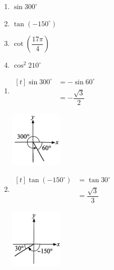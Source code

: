 \documentclass{report}
\begin{document}
\newpage
\begin{question}
    \begin{multicols}{4}
        \begin{enumerate}[label=(\alph*)]
            \item $\sin 300^\circ$
            \item $\tan\left(-150^\circ\right)$
            \item \vspace*{-1.1em}$\cot\left(\dfrac{17\pi}{4}\right)$
            \item $\cos^2 210^\circ$
        \end{enumerate}
    \end{multicols}

    \sol{}
        \begin{enumerate}[label=(\alph*),leftmargin=*]
            \item \begin{multicols}{2}
                $\begin{aligned}[t]
                    \sin 300^\circ &= -\sin 60^\circ \\
                    &= -\dfrac{\sqrt{3}}{2}
                \end{aligned}$
                \vfill\null
                \begin{center}
                    \includegraphics[width=0.2\textwidth]{assets/9-13.jpg}
                \end{center}
            \end{multicols}
            \vspace{-3em}
            \item \begin{multicols}{2}
                $\begin{aligned}[t]
                    \tan\left(-150^\circ\right) &= \tan 30^\circ \\
                    &= \dfrac{\sqrt{3}}{3}
                \end{aligned}$
                \vfill\null
                \begin{center}
                    \includegraphics[width=0.2\textwidth]{assets/9-14.jpg}

\end{center}
\end{multicols}
\end{enumerate}
\end{question}
\end{document}
